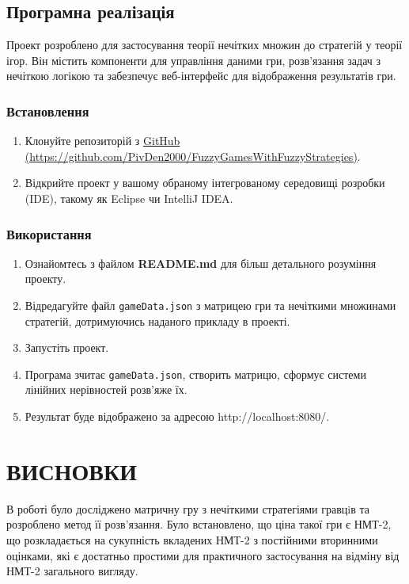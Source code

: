 \documentclass[14pt, a4paper, oneside]{extarticle}
\numberwithin{equation}{section}
\begin{document}
\clearpage
\subsection{Програмна реалізація}

Проект розроблено для застосування теорії нечітких множин до стратегій у теорії ігор. Він містить компоненти для управління даними гри, розв'язання задач з нечіткою логікою та забезпечує веб-інтерфейс для відображення результатів гри.

\subsubsection*{Встановлення}

\begin{enumerate}
\item Клонуйте репозиторій з \href{https://github.com/PivDen2000/FuzzyGamesWithFuzzyStrategies}{GitHub \\(https://github.com/PivDen2000/FuzzyGamesWithFuzzyStrategies)}.
\item Відкрийте проект у вашому обраному інтегрованому середовищі розробки (IDE), такому як Eclipse чи IntelliJ IDEA.
\end{enumerate}

\subsubsection*{Використання}

\begin{enumerate}
\item Ознайомтесь з файлом \textbf{README.md} для більш детального розуміння проекту.
\item Відредагуйте файл \texttt{gameData.json} з матрицею гри та нечіткими множинами стратегій, дотримуючись наданого прикладу в проекті.
\item Запустіть проект.
\item Програма зчитає \texttt{gameData.json}, створить матрицю, сформує системи лінійних нерівностей розв'яже їх.
\item Результат буде відображено за адресою http://localhost:8080/.
\end{enumerate}

\section*{ВИСНОВКИ}
В роботі було досліджено матричну гру з нечіткими стратегіями гравцiв та розроблено метод її розв’язання. Було встановлено, що ціна такої гри є НМТ-2, що розкладається на сукупність вкладених НМТ-2 з постійними вторинними оцінками, які є достатньо простими для практичного застосування на відміну від НМТ-2 загального вигляду.
\end{document}
